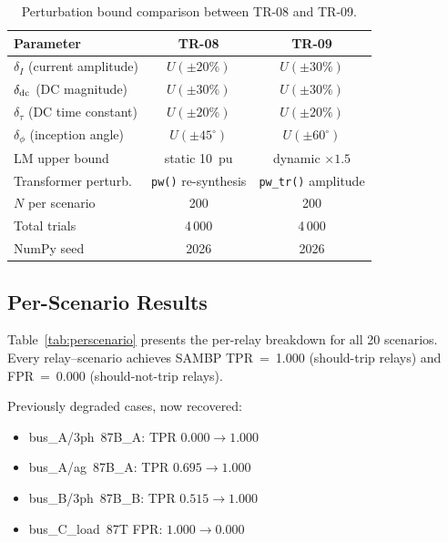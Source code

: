 \documentclass[12pt,a4paper]{article}
\begin{document}
\begin{table}[ht]
\centering
\caption{Perturbation bound comparison between TR-08 and TR-09.}
\label{tab:bounds}
\begin{tabular}{lcc}
\toprule
Parameter & TR-08 & TR-09 \\
\midrule
$\delta_I$ (current amplitude)   & $U(\pm20\%)$ & $U(\pm30\%)$ \\
$\delta_{\rm dc}$ (DC magnitude) & $U(\pm30\%)$ & $U(\pm30\%)$ \\
$\delta_\tau$ (DC time constant) & $U(\pm20\%)$ & $U(\pm20\%)$ \\
$\delta_\phi$ (inception angle)  & $U(\pm45^\circ)$ & $U(\pm60^\circ)$ \\
\midrule
LM upper bound       & static 10~pu & dynamic $\times 1.5$ \\
Transformer perturb. & \texttt{pw()} re-synthesis & \texttt{pw\_tr()} amplitude \\
$N$ per scenario     & 200 & 200 \\
Total trials         & 4\,000 & 4\,000 \\
NumPy seed           & 2026 & 2026 \\
\bottomrule
\end{tabular}
\end{table}

\subsection{Per-Scenario Results}

Table~\ref{tab:perscenario} presents the per-relay breakdown for all 20
scenarios.  Every relay--scenario achieves SAMBP TPR~=~1.000
(should-trip relays) and FPR~=~0.000 (should-not-trip relays).

Previously degraded cases, now recovered:
\begin{itemize}[noitemsep]
  \item bus\_A/3ph~87B\_A: TPR $0.000 \to 1.000$ 
  \item bus\_A/ag~87B\_A: TPR $0.695 \to 1.000$ 
  \item bus\_B/3ph~87B\_B: TPR $0.515 \to 1.000$ 
  \item bus\_C\_load~87T FPR: $1.000 \to 0.000$ 
\end{itemize}
\end{document}

